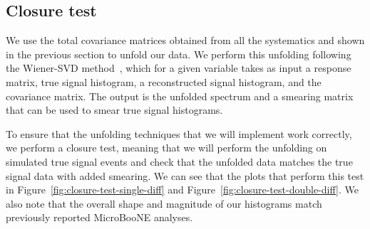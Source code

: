 \documentclass{article}
\begin{document}
\subsection{Closure test}

We use the total covariance matrices obtained from all the systematics and shown in the previous section
to unfold our data. We perform this unfolding following the Wiener-SVD method~\cite{Tang_2017}, which
for a given variable takes as input a response matrix, true signal histogram, a reconstructed signal histogram, and the 
covariance matrix. The output is the unfolded spectrum and a smearing matrix that can be used to smear 
true signal histograms.

To ensure that the unfolding techniques that we will implement work correctly, we perform a closure test,
meaning that we will perform the unfolding on simulated true signal events and check that the unfolded 
data matches the true signal data with added smearing. We can see that the plots that perform this test 
in Figure~\ref{fig:closure-test-single-diff} and Figure~\ref{fig:closure-test-double-diff}. We also note
that the overall shape and magnitude of our histograms match previously reported MicroBooNE analyses. 
\end{document}
